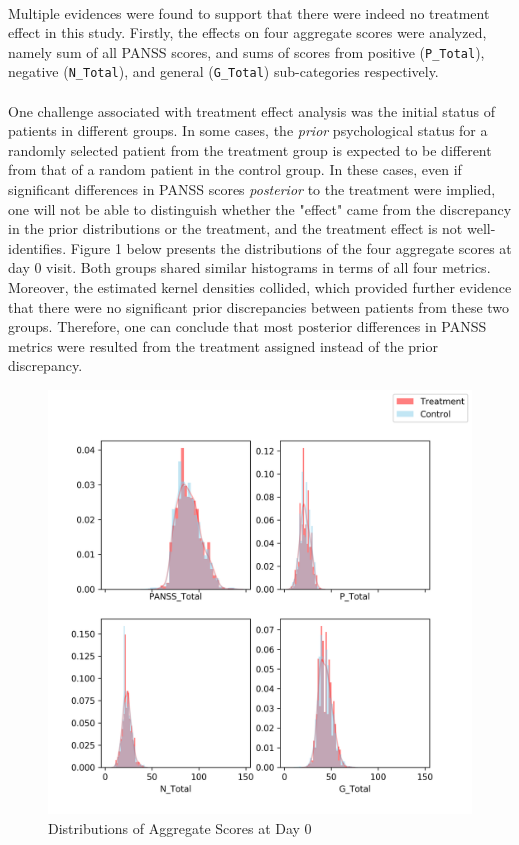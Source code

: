 \documentclass[11pt]{article}
\begin{document}
	\paragraph{}Multiple evidences were found to support that there were indeed no treatment effect in this study. Firstly, the effects on four aggregate scores were analyzed, namely sum of all PANSS scores, and sums of scores from positive (\texttt{P\_Total}), negative (\texttt{N\_Total}), and general (\texttt{G\_Total}) sub-categories respectively.
	
	\paragraph{}One challenge associated with treatment effect analysis was the initial status of patients in different groups. In some cases, the \emph{prior} psychological status for a randomly selected patient from the treatment group is expected to be different from that of a random patient in the control group. In these cases, even if significant differences in PANSS scores \emph{posterior} to the treatment were implied, one will not be able to distinguish whether the "effect" came from the discrepancy in the prior distributions or the treatment, and the treatment effect is not well-identifies.
	Figure 1 below presents the distributions of the four aggregate scores at day 0 visit. Both groups shared similar histograms in terms of all four metrics. Moreover, the estimated kernel densities collided, which provided further evidence that there were no significant prior discrepancies between patients from these two groups. Therefore, one can conclude that most posterior differences in PANSS metrics were resulted from the treatment assigned instead of the prior discrepancy.

	\begin{figure}[H]
		\centering
		\includegraphics[width=0.7\linewidth]{figures/dist_initial_scores.png}
		\caption{Distributions of Aggregate Scores at Day 0}
	\end{figure}
\end{document}
